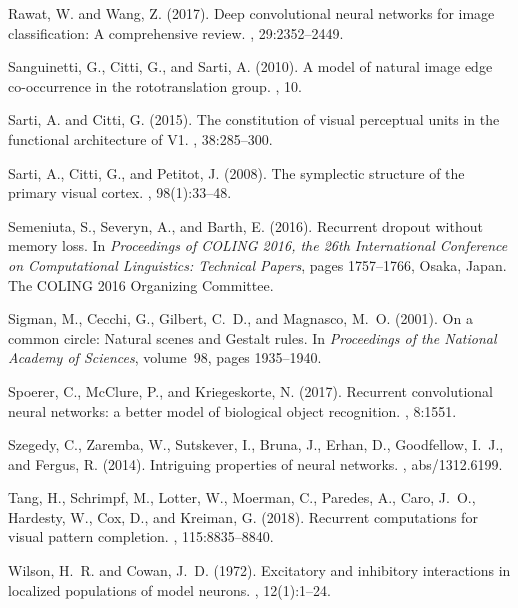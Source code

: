 \documentclass[11pt,oneside,reqno]{amsart}
\begin{document}
\begin{thebibliography}{}
Rawat, W. and Wang, Z. (2017).
\newblock Deep convolutional neural networks for image classification: A
  comprehensive review.
, 29:2352--2449.

Sanguinetti, G., Citti, G., and Sarti, A. (2010).
\newblock A model of natural image edge co-occurrence in the rototranslation
  group.
, 10.

Sarti, A. and Citti, G. (2015).
\newblock The constitution of visual perceptual units in the functional
  architecture of {V}1.
, 38:285--300.

Sarti, A., Citti, G., and Petitot, J. (2008).
\newblock The symplectic structure of the primary visual cortex.
, 98(1):33--48.

Semeniuta, S., Severyn, A., and Barth, E. (2016).
\newblock Recurrent dropout without memory loss.
\newblock In {\em Proceedings of COLING 2016, the 26th International Conference
  on Computational Linguistics: Technical Papers}, pages 1757--1766, Osaka,
  Japan. The COLING 2016 Organizing Committee.

Sigman, M., Cecchi, G., Gilbert, C.~D., and Magnasco, M.~O. (2001).
\newblock On a common circle: Natural scenes and {G}estalt rules.
\newblock In {\em Proceedings of the National Academy of Sciences}, volume~98,
  pages 1935--1940.

Spoerer, C., McClure, P., and Kriegeskorte, N. (2017).
\newblock Recurrent convolutional neural networks: a better model of biological
  object recognition.
, 8:1551.

Szegedy, C., Zaremba, W., Sutskever, I., Bruna, J., Erhan, D., Goodfellow,
  I.~J., and Fergus, R. (2014).
\newblock Intriguing properties of neural networks.
, abs/1312.6199.

Tang, H., Schrimpf, M., Lotter, W., Moerman, C., Paredes, A., Caro, J.~O.,
  Hardesty, W., Cox, D., and Kreiman, G. (2018).
\newblock Recurrent computations for visual pattern completion.
, 115:8835--8840.

Wilson, H.~R. and Cowan, J.~D. (1972).
\newblock Excitatory and inhibitory interactions in localized populations of
  model neurons.
, 12(1):1--24.


\end{thebibliography}
\end{document}
